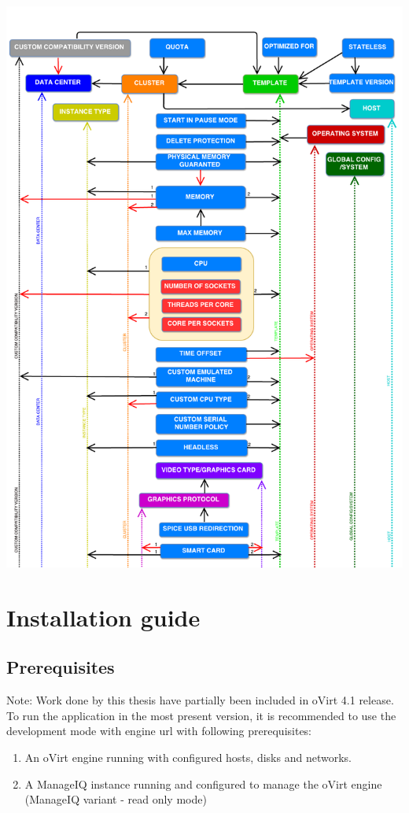 \includegraphics[page=3, width=1.00\textwidth, angle=0]{DependencyGraph}

\chapter{Installation guide} \label{install}

\section{Prerequisites}
Note: Work done by this thesis have partially been included in oVirt 4.1 release. To run the application in the most present version, it is recommended to use the development mode with engine url with following prerequisites: 

\begin{enumerate}
\item An oVirt engine running with configured hosts, disks and networks.  
\item A ManageIQ instance running and configured to manage the oVirt engine (ManageIQ variant - read only mode)
\end{enumerate} 

